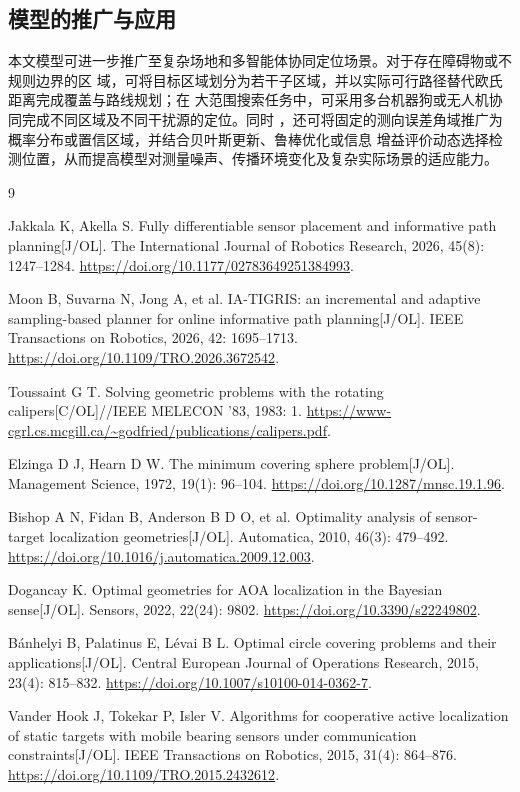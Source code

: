 \documentclass[withoutpreface,bwprint]{cumcmthesis} %
\begin{document}
\subsection{模型的推广与应用}

本文模型可进一步推广至复杂场地和多智能体协同定位场景。对于存在障碍物或不规则边界的区
域，可将目标区域划分为若干子区域，并以实际可行路径替代欧氏距离完成覆盖与路线规划；在
大范围搜索任务中，可采用多台机器狗或无人机协同完成不同区域及不同干扰源的定位。同时
，还可将固定的测向误差角域推广为概率分布或置信区域，并结合贝叶斯更新、鲁棒优化或信息
增益评价动态选择检测位置，从而提高模型对测量噪声、传播环境变化及复杂实际场景的适应能力。



\begin{thebibliography}{9}

Jakkala K, Akella S.
Fully differentiable sensor placement and informative path planning[J/OL].
The International Journal of Robotics Research, 2026, 45(8): 1247--1284.
\url{https://doi.org/10.1177/02783649251384993}.

Moon B, Suvarna N, Jong A, et al.
IA-TIGRIS: an incremental and adaptive sampling-based planner for online
informative path planning[J/OL].
IEEE Transactions on Robotics, 2026, 42: 1695--1713.
\url{https://doi.org/10.1109/TRO.2026.3672542}.

Toussaint G T.
Solving geometric problems with the rotating calipers[C/OL]//IEEE MELECON '83,
1983: 1.
\url{https://www-cgrl.cs.mcgill.ca/~godfried/publications/calipers.pdf}.

Elzinga D J, Hearn D W.
The minimum covering sphere problem[J/OL].
Management Science, 1972, 19(1): 96--104.
\url{https://doi.org/10.1287/mnsc.19.1.96}.

Bishop A N, Fidan B, Anderson B D O, et al.
Optimality analysis of sensor-target localization geometries[J/OL].
Automatica, 2010, 46(3): 479--492.
\url{https://doi.org/10.1016/j.automatica.2009.12.003}.

Dogancay K.
Optimal geometries for AOA localization in the Bayesian sense[J/OL].
Sensors, 2022, 22(24): 9802.
\url{https://doi.org/10.3390/s22249802}.

B\'{a}nhelyi B, Palatinus E, L\'{e}vai B L.
Optimal circle covering problems and their applications[J/OL].
Central European Journal of Operations Research, 2015, 23(4): 815--832.
\url{https://doi.org/10.1007/s10100-014-0362-7}.

Vander Hook J, Tokekar P, Isler V.
Algorithms for cooperative active localization of static targets with mobile
bearing sensors under communication constraints[J/OL].
IEEE Transactions on Robotics, 2015, 31(4): 864--876.
\url{https://doi.org/10.1109/TRO.2015.2432612}.

\end{thebibliography}
  
\end{document}

